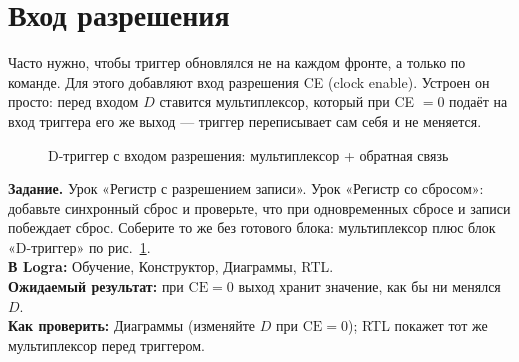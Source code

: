 \section{Вход разрешения}

Часто нужно, чтобы триггер обновлялся не на каждом фронте, а только по
команде. Для этого добавляют вход разрешения CE (clock enable). Устроен он
просто: перед входом $D$ ставится мультиплексор, который при CE $=0$ подаёт
на вход триггера его же выход --- триггер переписывает сам себя и не меняется.

\begin{figure}[H]
\centering
{}
\caption{D-триггер с входом разрешения: мультиплексор + обратная связь}
\label{fig:ce}
\end{figure}

\begin{diybox}
\textbf{Задание.}  Урок «Регистр с разрешением записи». 
Урок «Регистр со сбросом»: добавьте синхронный сброс и проверьте, что при
одновременных сбросе и записи побеждает сброс.  Соберите то же без
готового блока: мультиплексор плюс блок «D-триггер» по рис.~\ref{fig:ce}.\\
\textbf{В Logra:} Обучение, Конструктор, Диаграммы, RTL.\\
\textbf{Ожидаемый результат:} при $\text{CE}=0$ выход хранит значение, как бы
ни менялся $D$.\\
\textbf{Как проверить:} Диаграммы (изменяйте $D$ при $\text{CE}=0$); RTL
покажет тот же мультиплексор перед триггером.
\end{diybox}

